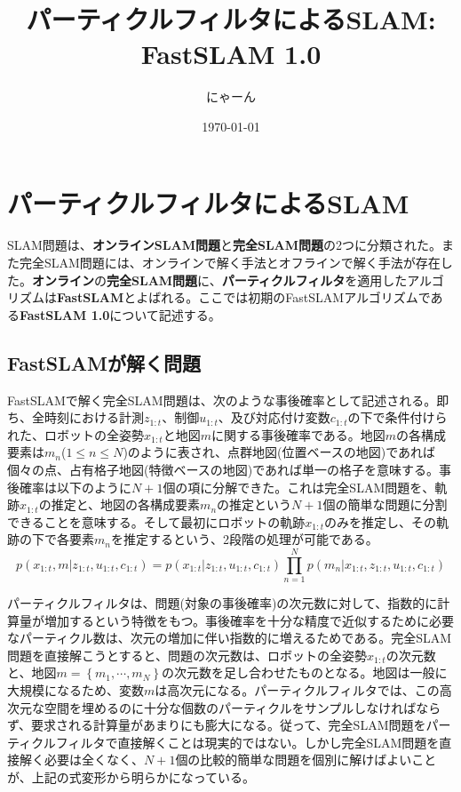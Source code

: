 \documentclass[dvipdfmx,a4paper]{jsarticle}
\title{パーティクルフィルタによるSLAM: FastSLAM 1.0}
\author{にゃーん}
\date{\today}
\begin{document}
\maketitle

\section{パーティクルフィルタによるSLAM}
SLAM問題は、\textbf{オンラインSLAM問題}と\textbf{完全SLAM問題}の2つに分類された。また完全SLAM問題には、オンラインで解く手法とオフラインで解く手法が存在した。\textbf{オンライン}の\textbf{完全SLAM問題}に、\textbf{パーティクルフィルタ}を適用したアルゴリズムは\textbf{FastSLAM}とよばれる。ここでは初期のFastSLAMアルゴリズムである\textbf{FastSLAM 1.0}について記述する。

\subsection{FastSLAMが解く問題}
FastSLAMで解く完全SLAM問題は、次のような事後確率として記述される。即ち、全時刻における計測$z_{1 : t}$、制御$u_{1 : t}$、及び対応付け変数$c_{1 : t}$の下で条件付けられた、ロボットの全姿勢$x_{1 : t}$と地図$m$に関する事後確率である。地図$m$の各構成要素は$m_n$($1 \le n \le N$)のように表され、点群地図(位置ベースの地図)であれば個々の点、占有格子地図(特徴ベースの地図)であれば単一の格子を意味する。事後確率は以下のように$N + 1$個の項に分解できた。これは完全SLAM問題を、軌跡$x_{1 : t}$の推定と、地図の各構成要素$m_n$の推定という$N + 1$個の簡単な問題に分割できることを意味する。そして最初にロボットの軌跡$x_{1 : t}$のみを推定し、その軌跡の下で各要素$m_n$を推定するという、2段階の処理が可能である。
\begin{equation}
	p(x_{1 : t}, m | z_{1 : t}, u_{1 : t}, c_{1 : t}) = p(x_{1 : t} | z_{1 : t}, u_{1 : t}, c_{1 : t}) \prod_{n = 1}^N p(m_n | x_{1 : t}, z_{1 : t}, u_{1 : t}, c_{1 : t})
\end{equation}

パーティクルフィルタは、問題(対象の事後確率)の次元数に対して、指数的に計算量が増加するという特徴をもつ。事後確率を十分な精度で近似するために必要なパーティクル数は、次元の増加に伴い指数的に増えるためである。完全SLAM問題を直接解こうとすると、問題の次元数は、ロボットの全姿勢$x_{1 : t}$の次元数と、地図$m = \left\{ m_1, \cdots, m_N \right\}$の次元数を足し合わせたものとなる。地図は一般に大規模になるため、変数$m$は高次元になる。パーティクルフィルタでは、この高次元な空間を埋めるのに十分な個数のパーティクルをサンプルしなければならず、要求される計算量があまりにも膨大になる。従って、完全SLAM問題をパーティクルフィルタで直接解くことは現実的ではない。しかし完全SLAM問題を直接解く必要は全くなく、$N + 1$個の比較的簡単な問題を個別に解けばよいことが、上記の式変形から明らかになっている。\newline
\end{document}
